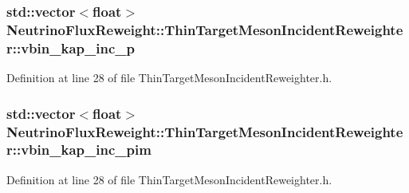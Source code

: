 \hypertarget{class_neutrino_flux_reweight_1_1_thin_target_meson_incident_reweighter_af309e694aff739fbb0e3805b42fcd515}{
\subsubsection[{vbin\-\_\-kap\-\_\-inc\-\_\-p}]{\setlength{\rightskip}{0pt plus 5cm}std\-::vector$<$float$>$ Neutrino\-Flux\-Reweight\-::\-Thin\-Target\-Meson\-Incident\-Reweighter\-::vbin\-\_\-kap\-\_\-inc\-\_\-p}}\label{class_neutrino_flux_reweight_1_1_thin_target_meson_incident_reweighter_af309e694aff739fbb0e3805b42fcd515}


Definition at line 28 of file Thin\-Target\-Meson\-Incident\-Reweighter.\-h.

\hypertarget{class_neutrino_flux_reweight_1_1_thin_target_meson_incident_reweighter_a244ee71b70a5e13611fe3cac77dd5848}{
\subsubsection[{vbin\-\_\-kap\-\_\-inc\-\_\-pim}]{\setlength{\rightskip}{0pt plus 5cm}std\-::vector$<$float$>$ Neutrino\-Flux\-Reweight\-::\-Thin\-Target\-Meson\-Incident\-Reweighter\-::vbin\-\_\-kap\-\_\-inc\-\_\-pim}}\label{class_neutrino_flux_reweight_1_1_thin_target_meson_incident_reweighter_a244ee71b70a5e13611fe3cac77dd5848}


Definition at line 28 of file Thin\-Target\-Meson\-Incident\-Reweighter.\-h.

